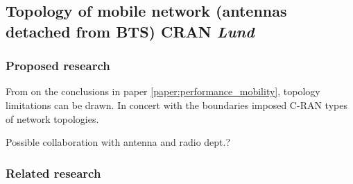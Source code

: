\subsection{Topology of mobile network (antennas detached from BTS) CRAN \emph{Lund}}
\subsubsection{Proposed research}
From on the conclusions in paper \ref{paper:performance_mobility}, topology limitations can be drawn. In concert with the boundaries imposed C-RAN types of network topologies.

Possible collaboration with antenna and radio dept.?
\subsubsection{Related research}